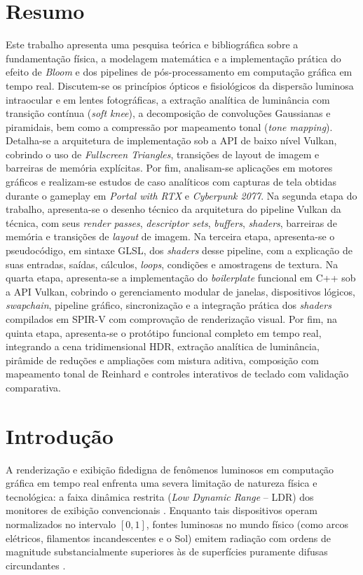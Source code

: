 \documentclass[12pt,a4paper]{article}
\begin{document}
\section*{Resumo}
Este trabalho apresenta uma pesquisa teórica e bibliográfica sobre a fundamentação física, a modelagem matemática e a implementação prática do efeito de \textit{Bloom} e dos pipelines de pós-processamento em computação gráfica em tempo real. Discutem-se os princípios ópticos e fisiológicos da dispersão luminosa intraocular e em lentes fotográficas, a extração analítica de luminância com transição contínua (\textit{soft knee}), a decomposição de convoluções Gaussianas e piramidais, bem como a compressão por mapeamento tonal (\textit{tone mapping}). Detalha-se a arquitetura de implementação sob a API de baixo nível Vulkan, cobrindo o uso de \textit{Fullscreen Triangles}, transições de layout de imagem e barreiras de memória explícitas. Por fim, analisam-se aplicações em motores gráficos e realizam-se estudos de caso analíticos com capturas de tela obtidas durante o gameplay em \textit{Portal with RTX} e \textit{Cyberpunk 2077}. Na segunda etapa do trabalho, apresenta-se o desenho técnico da arquitetura do pipeline Vulkan da técnica, com seus \textit{render passes}, \textit{descriptor sets}, \textit{buffers}, \textit{shaders}, barreiras de memória e transições de \textit{layout} de imagem. Na terceira etapa, apresenta-se o pseudocódigo, em sintaxe GLSL, dos \textit{shaders} desse pipeline, com a explicação de suas entradas, saídas, cálculos, \textit{loops}, condições e amostragens de textura. Na quarta etapa, apresenta-se a implementação do \textit{boilerplate} funcional em C++ sob a API Vulkan, cobrindo o gerenciamento modular de janelas, dispositivos lógicos, \textit{swapchain}, pipeline gráfico, sincronização e a integração prática dos \textit{shaders} compilados em SPIR-V com comprovação de renderização visual. Por fim, na quinta etapa, apresenta-se o protótipo funcional completo em tempo real, integrando a cena tridimensional HDR, extração analítica de luminância, pirâmide de reduções e ampliações com mistura aditiva, composição com mapeamento tonal de Reinhard e controles interativos de teclado com validação comparativa.

\vspace{1cm}

\section{Introdução}
A renderização e exibição fidedigna de fenômenos luminosos em computação gráfica em tempo real enfrenta uma severa limitação de natureza física e tecnológica: a faixa dinâmica restrita (\textit{Low Dynamic Range} -- LDR) dos monitores de exibição convencionais \cite{seetzen2004hdr}. Enquanto tais dispositivos operam normalizados no intervalo $[0, 1]$, fontes luminosas no mundo físico (como arcos elétricos, filamentos incandescentes e o Sol) emitem radiação com ordens de magnitude substancialmente superiores às de superfícies puramente difusas circundantes \cite{seetzen2004hdr}.
\end{document}
